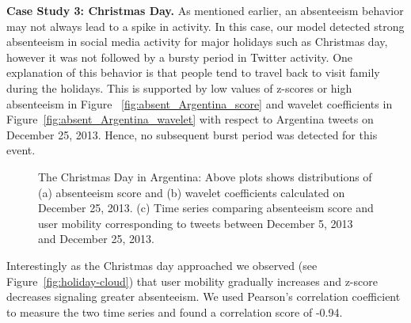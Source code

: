 \documentclass[conference]{IEEEtran}
\begin{document}
\textbf{Case Study 3: Christmas Day.}
As mentioned earlier, an absenteeism behavior may not always lead to a spike in activity. In this case, our model detected strong absenteeism in social media activity for major holidays such as Christmas day, however it was not followed by a bursty period in Twitter activity. One explanation of this behavior is that people tend to travel back to visit family during the holidays. This is supported by low values of z-scores or high absenteeism in Figure~ \ref{fig:absent_Argentina_score} and wavelet coefficients in Figure~\ref{fig:absent_Argentina_wavelet} with respect to Argentina tweets on December 25, 2013. Hence, no subsequent burst period was detected for this event.

\begin{figure}[t]
	\centering
	\caption{The Christmas Day in Argentina: Above plots shows distributions of (a) absenteeism score and (b) wavelet coefficients calculated on December 25, 2013. (c) Time series comparing absenteeism score and user mobility corresponding to tweets between December 5, 2013 and December 25, 2013.}
\label{fig:case3_wavelet}
\end{figure}
Interestingly as the Christmas day approached we observed (see Figure~\ref{fig:holiday-cloud}) that user mobility gradually increases and z-score decreases signaling greater absenteeism. We used Pearson's correlation coefficient to measure the two time series and found a correlation score of -0.94.
\end{document}
